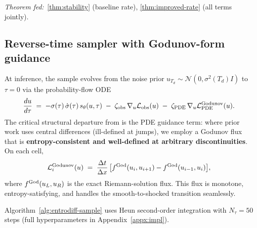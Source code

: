 \emph{Theorem fed:}~\ref{thm:stability} (baseline rate), \ref{thm:improved-rate} (all terms jointly).

\subsection{Reverse-time sampler with Godunov-form guidance}
\label{sec:method:sampler}

At inference, the sample evolves from the noise prior $u_{T_{d}}\sim\mathcal{N}(0,\sigma^{2}(T_{d})I)$ to $\tau=0$ via the probability-flow {ODE}
\begin{equation}
  \label{eq:reverse-ode}
  \frac{du}{d\tau} \;=\;
    -\sigma(\tau)\,\dot\sigma(\tau)\,s_{\theta}(u,\tau)
    \;-\;
    \zeta_{\mathrm{obs}}\,\nabla_{u}\mathcal{L}_{\mathrm{obs}}(u)
    \;-\;
    \zeta_{\mathrm{PDE}}\,\nabla_{u}\mathcal{L}_{\mathrm{PDE}}^{\mathrm{Godunov}}(u).
\end{equation}
The critical structural departure from \cite{huang2024diffusionpde,yao2025fundps} is the {PDE} guidance term: where prior work uses central differences (ill-defined at jumps), we employ a Godunov flux that is \textbf{entropy-consistent and well-defined at arbitrary discontinuities}. On each cell,
\begin{equation}
  \label{eq:godunov}
  \mathcal{L}_{i}^{\mathrm{Godunov}}(u) \;=\;
    \frac{\Delta t}{\Delta x}\,
    \bigl[f^{\mathrm{God}}(u_{i},u_{i+1}) - f^{\mathrm{God}}(u_{i-1},u_{i})\bigr],
\end{equation}
where $f^{\mathrm{God}}(u_{L},u_{R})$ is the exact Riemann-solution flux. This flux is monotone, entropy-satisfying, and handles the smooth-to-shocked transition seamlessly.

Algorithm~\ref{alg:entrodiff-sample} uses Heun second-order integration with $N_{\tau}=50$ steps (full hyperparameters in Appendix~\ref{appx:impl}).

